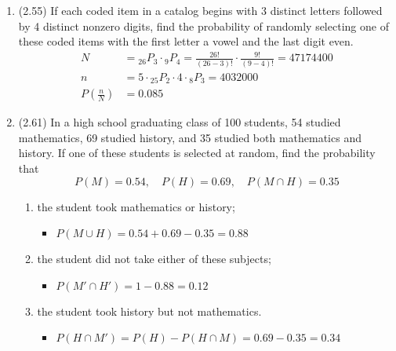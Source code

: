 \documentclass[basic, header]{nosvagor-notes} \usepackage{nosvagor-math}
\begin{document}
\begin{enumerate}[itemsep=8em]
\begin{enumerate}
\begin{itemize}
        \end{itemize}

    \end{enumerate}

    \vspace{-5em}

  \item (2.55) If each coded item in a catalog begins with 3 distinct
    letters followed by 4 distinct nonzero digits, find the probability of
    randomly selecting one of these coded items with the first letter a vowel
    and the last digit even.
      \begin{align*}
          N  &= {}_{26}P_3 \cdot {}_9P_4
             = \frac{26!}{(26-3)!}\cdot \frac{9!}{(9-4)!}
             = \num{47174400}\\
          n &= 5 \cdot {}_{25}P_2 \cdot 4 \cdot {}_8P_3 = \num{4032000} \\
          P\left(\frac{n}{N}\right)  &= 0.085
      \end{align*}

    \vspace{-5em}

  \item (2.61) In a high school graduating class of 100 students, 54
    studied mathematics, 69 studied history, and 35 studied both mathematics
    and history. If one of these students is selected at random, find the
    probability that
    \[%
      P(M) = 0.54, \quad P(H) = 0.69, \quad P(M\cap H) = 0.35
    \]%
    \begin{enumerate}
      \item the student took mathematics or history;
        \begin{itemize}
          \item \(P(M \cup H) = 0.54 + 0.69 - 0.35 = 0.88\)

        \end{itemize}

      \item the student did not take either of these subjects;
        \begin{itemize}
          \item \(P(M' \cap H') = 1 - 0.88 = 0.12\)

        \end{itemize}

      \item the student took history but not mathematics.
        \begin{itemize}
          \item \(P(H \cap M') = P(H) - P(H \cap M) = 0.69 - 0.35 = 0.34 \)


\end{itemize}
\end{enumerate}
\end{enumerate}
\end{document}
